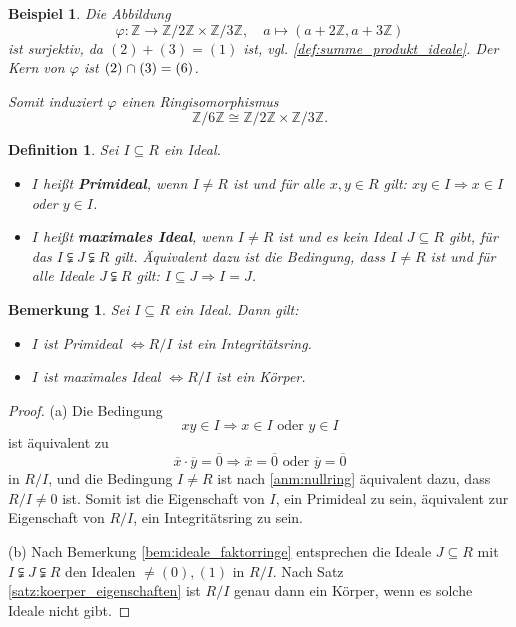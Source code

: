 \documentclass[a4paper, twoside, 11pt, ngerman]{report}
\newcommand{\ZZ}{\mathds Z}
\renewcommand{\cap}{\;\rotatebox{90}{\reflectbox{\rotatebox{270}{$\cup$}}}\;}
\theoremstyle{definistyle}
\newtheorem{defini}[satz]{Definition}
\newtheorem{bem}[satz]{Bemerkung}
\newtheorem{bsp}[satz]{Beispiel}
\theoremstyle{remark}
\newcommand{\defn}[1]{\textit{\bfseries #1}}
\begin{document}
\begin{bsp}\label{bsp:produkt_ideale}
Die Abbildung 
\[\varphi \colon \ZZ \to \ZZ / 2\ZZ \times \ZZ / 3\ZZ, \quad a \mapsto (a + 2\ZZ, a + 3\ZZ)\] ist surjektiv, da $(2) + (3) = (1)$ ist, vgl. \ref{def:summe_produkt_ideale}. Der Kern von $\varphi$ ist $(2) \cap (3) = (6)$.

Somit induziert $\varphi$ einen Ringisomorphismus
\[
\ZZ / 6\ZZ \cong \ZZ / 2\ZZ \times \ZZ / 3\ZZ.
\]
\end{bsp}

\begin{defini}\label{def:primideal_maximalideal}
Sei $I \subseteq R$ ein Ideal.
\begin{itemize}
    \item $I$ heißt \defn{Primideal}, wenn $I \neq R$ ist und für alle $x, y \in R$ gilt: $x y \in I \Rightarrow x \in I$ oder $y \in I$.
    \item $I$ heißt \defn{maximales Ideal}, wenn $I \neq R$ ist und es kein Ideal $J \subseteq R$ gibt, für das $I \subsetneqq J \subsetneqq R$ gilt. Äquivalent dazu ist die Bedingung, dass $I\neq R$ ist und für alle Ideale $J\subsetneqq R$ gilt: $I\subseteq J\Rightarrow I=J$.
\end{itemize}
\end{defini}

\begin{bem}\label{bem:primideal_maximalideal_faktorring}
Sei $I \subseteq R$ ein Ideal. Dann gilt:
\begin{itemize}
    \item[(a)] $I$ ist Primideal $\iff R / I$ ist ein Integritätsring.
    \item[(b)] $I$ ist maximales Ideal $\iff R / I$ ist ein Körper.
\end{itemize}
\end{bem}

\begin{proof}
(a) Die Bedingung
\[
x y \in I \Rightarrow x \in I \text{ oder } y \in I
\]
ist äquivalent zu
\[
\overline{x} \cdot \overline{y} = \overline{0} \Rightarrow \overline{x} = \overline{0} \text{ oder } \overline{y} = \overline{0}
\]
in $R / I$, und die Bedingung $I \neq R$ ist nach \ref{anm:nullring} äquivalent dazu, dass $R / I \neq 0$ ist.
Somit ist die Eigenschaft von $I$, ein Primideal zu sein, äquivalent zur Eigenschaft von $R / I$,
ein Integritätsring zu sein.

(b) Nach Bemerkung \ref{bem:ideale_faktorringe} entsprechen die Ideale $J \subseteq R$ mit $I \subsetneqq J \subsetneqq R$ den Idealen $\neq(0),(1)$ in $R / I$. Nach Satz \ref{satz:koerper_eigenschaften} ist $R / I$ genau dann ein Körper, wenn es solche Ideale nicht gibt.
\end{proof}
\end{document}
